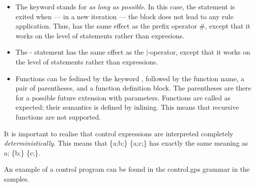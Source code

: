 \begin{itemize}
\item The \alapK{} keyword stands for \emph{as long as possible}. In this case,
  the statement is exited when --- in a new iteration --- the block does not
  lead to any rule application. Thus, \alapK{} has the same effect as the
  prefix operator \textsf{\#}, except that it works on the level of statements
  rather than expresions.

\item The \choiceK-\doK{} statement has the same effect as the
  \textsf{$|$}-operator, except that it works on the level of statements rather
  than expressions.

\item Functions can be fedined by the keyword \functionK, followed by the
  function name, a pair of parentheses, and a function definition block. The
  parentheses are there for a possible future extension with
  parameters. Functions are called as expected; their semantics is defined by
  inlining. This means that recursive functions are not supported.
\end{itemize}
%
It is important to realise that control expressions are interpreted completely
\emph{deterministically}. This means that \textsf{\choiceK{} \{a;b;\} \orK{}
\{a;c;\}} has exactly the same meaning as \textsf{a; \choiceK{} \{b;\} \orK{}
\{c;\}}.

An example of a control program can be found in the \textsf{control.gps}
grammar in the \GROOVE samples.
